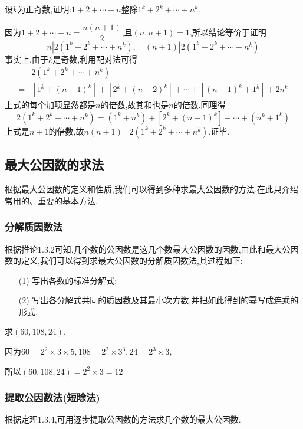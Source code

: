\example 设$k$为正奇数,证明:$1+2+\cdots+n$整除$1^{k}+2^{k}+\cdots+n^{k}$.

\proof 因为$1+2+\cdots+n=\dfrac{n(n+1)}{2}$,且$(n, n+1)=1$,所以结论等价于证明
\begin{equation*}
	n\left|2\left(1^{k}+2^{k}+\cdots+n^{k}\right), \quad(n+1)\right| 2\left(1^{k}+2^{k}+\cdots+n^{k}\right)
\end{equation*}
事实上,由于$k$是奇数,利用配对法可得
\begin{equation*}
	\begin{split}
		&2\left(1^{k}+2^{k}+\cdots+n^{k}\right)\\
		=&\left[1^{k}+(n-1)^{k}\right]+\left[2^{k}+(n-2)^{k}\right]+\cdots+\left[(n-1)^{k}+1^{k}\right]+2 n^{k}
	\end{split}
\end{equation*}
上式的每个加项显然都是$n$的倍数,故其和也是$n$的倍数.同理得
\begin{equation*}
	2\left(1^{k}+2^{k}+\cdots+n^{k}\right)=\left(1^{k}+n^{k}\right)+\left[2^{k}+(n-1)^{k}\right]+\cdots+\left(n^{k}+1^{k}\right)
\end{equation*}
上式是$n+1$的倍数,故$n(n+1) \mid 2\left(1^{k}+2^{k}+\cdots+n^{k}\right)$.证毕.

\subsection{最大公因数的求法}
根据最大公因数的定义和性质,我们可以得到多种求最大公因数的方法,在此只介绍常用的、重要的基本方法.

\subsubsection{分解质因数法}
根据推论1.3.2可知,几个数的公因数是这几个数最大公因数的因数,由此和最大公因 数的定义,我们可以得到求最大公因数的分解质因数法,其过程如下:
\begin{enumerate}[itemindent=2em]
	\item[(1)] 写出各数的标准分解式;
	\item[(2)] 写出各分解式共同的质因数及其最小次方数,并把如此得到的幂写成连乘的形式. 
\end{enumerate}

\example 求$(60,108,24)$.

\solve 因为$60=2^{2} \times 3 \times 5,108=2^{2} \times 3^{3}, 24=2^{3} \times 3$,

所以$(60,108,24)=2^{2} \times 3=12$

\subsubsection{提取公因数法(短除法)}
根据定理1.3.4,可用逐步提取公因数的方法求几个数的最大公因数.

